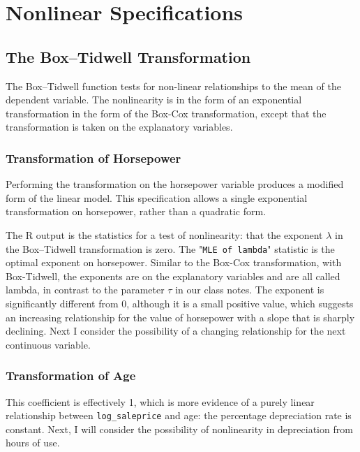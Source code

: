 \documentclass[11pt]{paper}
\begin{document}
\section{Nonlinear Specifications}


\subsection{The Box--Tidwell Transformation}

The Box--Tidwell function tests for non-linear relationships
to the mean of the dependent variable.
The nonlinearity is in the form of an
exponential transformation in the form of the Box-Cox
transformation, except that the transformation is taken
on the explanatory variables.


\subsubsection{Transformation of Horsepower}


Performing the transformation on the horsepower variable
produces a modified form of the linear model.
This specification allows a single exponential
transformation on horsepower, rather than a quadratic form.



The \textsf{R} output is the statistics for a test of nonlinearity:
that the exponent $\lambda$ in the Box--Tidwell transformation is zero.
%
The "\texttt{MLE of lambda}" statistic is the optimal exponent on horsepower.
Similar to the Box-Cox transformation,
with Box-Tidwell, the exponents are on the explanatory variables
and are all called lambda, in contrast
to the parameter $\tau$ in our class notes.
The exponent is significantly different from 0,
although it is a small positive value,
which suggests an increasing relationship
for the value of horsepower
with a slope that is sharply declining.
Next I consider the possibility of a changing relationship 
for the next continuous variable. 


\subsubsection{Transformation of Age}




This coefficient is effectively 1, which is more evidence of
a purely linear relationship between \texttt{log\_saleprice}
and age: the percentage depreciation rate is constant.
Next, I will consider the possibility of nonlinearity 
in depreciation from hours of use. 
\end{document}
